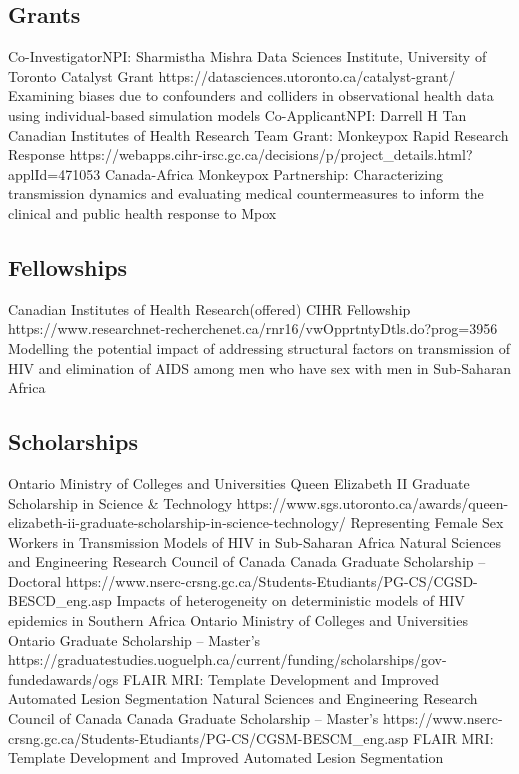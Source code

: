 \subsection{Grants}
  {Co-Investigator}{NPI: Sharmistha Mishra }
  {Data Sciences Institute, University of Toronto}
  {Catalyst Grant}
  {https://datasciences.utoronto.ca/catalyst-grant/}
  {Examining biases due to confounders and colliders in observational health data using individual-based simulation models}
  {Co-Applicant}{NPI: Darrell H Tan }
  {Canadian Institutes of Health Research}
  {Team Grant: Monkeypox Rapid Research Response}
  {https://webapps.cihr-irsc.gc.ca/decisions/p/project_details.html?applId=471053}
  {Canada-Africa Monkeypox Partnership: Characterizing transmission dynamics and evaluating medical countermeasures to inform the clinical and public health response to Mpox}
\subsection{Fellowships}
  {Canadian Institutes of Health Research}{(offered)}
  {CIHR Fellowship}
  {https://www.researchnet-recherchenet.ca/rnr16/vwOpprtntyDtls.do?prog=3956}
  {Modelling the potential impact of addressing structural factors on transmission of HIV and elimination of AIDS among men who have sex with men in Sub-Saharan Africa}
\subsection{Scholarships}
  {Ontario Ministry of Colleges and Universities}{}
  {Queen Elizabeth II Graduate Scholarship in Science \& Technology}
  {https://www.sgs.utoronto.ca/awards/queen-elizabeth-ii-graduate-scholarship-in-science-technology/}
  {Representing Female Sex Workers in Transmission Models of HIV in Sub-Saharan Africa}
  {Natural Sciences and Engineering Research Council of Canada}{}
  {Canada Graduate Scholarship -- Doctoral}
  {https://www.nserc-crsng.gc.ca/Students-Etudiants/PG-CS/CGSD-BESCD_eng.asp}
  {Impacts of heterogeneity on deterministic models of HIV epidemics in Southern Africa}
  {Ontario Ministry of Colleges and Universities}{}
  {Ontario Graduate Scholarship -- Master's}
  {https://graduatestudies.uoguelph.ca/current/funding/scholarships/gov-fundedawards/ogs}
  {FLAIR MRI: Template Development and Improved Automated Lesion Segmentation}
  {Natural Sciences and Engineering Research Council of Canada}{}
  {Canada Graduate Scholarship -- Master's}
  {https://www.nserc-crsng.gc.ca/Students-Etudiants/PG-CS/CGSM-BESCM_eng.asp}
  {FLAIR MRI: Template Development and Improved Automated Lesion Segmentation}

